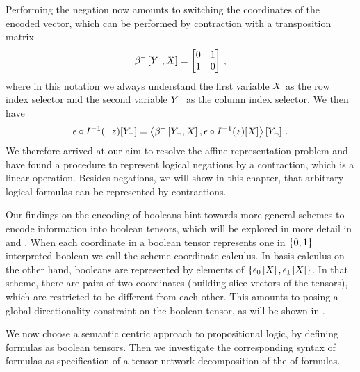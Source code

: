 Performing the negation now amounts to switching the coordinates of the encoded vector, which can be performed by contraction with a transposition matrix
\begin{align*}
    \beta^{\lnot}\left[Y_{\lnot},X\right] =
    \begin{bmatrix}
        0 & 1 \\
        1 & 0
    \end{bmatrix} \, ,
\end{align*}
where in this notation we always understand the first variable $X$ as the row index selector and the second variable $Y_{\lnot}$ as the column index selector.
We then have
\begin{align*}
    \epsilon\circ I^{-1}(\lnot z)[Y_{\lnot}]
    = \left\langle \beta^{\lnot}\left[Y_{\lnot},X\right],\epsilon\circ I^{-1}(z)[X]\right\rangle \left[ Y_{\lnot} \right] \, .
\end{align*}
We therefore arrived at our aim to resolve the affine representation problem and have found a procedure to represent logical negations by a contraction, which is a linear operation.
Besides negations, we will show in this chapter, that arbitrary logical formulas can be represented by contractions.


Our findings on the encoding of booleans hint towards more general schemes to encode information into boolean tensors, which will be explored in more detail in  and .
When each coordinate in a boolean tensor represents one in $\{0,1\}$ interpreted boolean we call the scheme coordinate calculus.
In basis calculus on the other hand, booleans are represented by elements of $\{\epsilon_0\left[X\right],\epsilon_1\left[X\right]\}$.
In that scheme, there are pairs of two coordinates (building slice vectors of the tensors), which are restricted to be different from each other.
This amounts to posing a global directionality constraint on the boolean tensor, as will be shown in .


We now choose a semantic centric approach to propositional logic, by defining formulas as boolean tensors.
Then we investigate the corresponding syntax of formulas as specification of a tensor network decomposition of the \basisEncoding{} of formulas.

